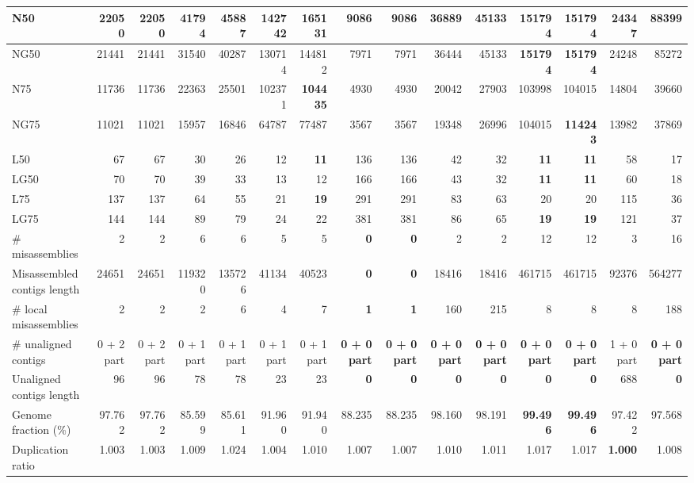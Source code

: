 \documentclass[12pt,a4paper]{article}
\begin{document}
\begin{table}[ht]
\begin{center}
\begin{tabular}{|l*{14}{|r}|}
N50 & 22050 & 22050 & 41794 & 45887 & 142742 & {\bf 165131} & 9086 & 9086 & 36889 & 45133 & 151794 & 151794 & 24347 & 88399 \\ \hline
NG50 & 21441 & 21441 & 31540 & 40287 & 130714 & 144812 & 7971 & 7971 & 36444 & 45133 & {\bf 151794} & {\bf 151794} & 24248 & 85272 \\ \hline
N75 & 11736 & 11736 & 22363 & 25501 & 102371 & {\bf 104435} & 4930 & 4930 & 20042 & 27903 & 103998 & 104015 & 14804 & 39660 \\ \hline
NG75 & 11021 & 11021 & 15957 & 16846 & 64787 & 77487 & 3567 & 3567 & 19348 & 26996 & 104015 & {\bf 114243} & 13982 & 37869 \\ \hline
L50 & 67 & 67 & 30 & 26 & 12 & {\bf 11} & 136 & 136 & 42 & 32 & {\bf 11} & {\bf 11} & 58 & 17 \\ \hline
LG50 & 70 & 70 & 39 & 33 & 13 & 12 & 166 & 166 & 43 & 32 & {\bf 11} & {\bf 11} & 60 & 18 \\ \hline
L75 & 137 & 137 & 64 & 55 & 21 & {\bf 19} & 291 & 291 & 83 & 63 & 20 & 20 & 115 & 36 \\ \hline
LG75 & 144 & 144 & 89 & 79 & 24 & 22 & 381 & 381 & 86 & 65 & {\bf 19} & {\bf 19} & 121 & 37 \\ \hline
\# misassemblies & 2 & 2 & 6 & 6 & 5 & 5 & {\bf 0} & {\bf 0} & 2 & 2 & 12 & 12 & 3 & 16 \\ \hline
Misassembled contigs length & 24651 & 24651 & 119320 & 135726 & 41134 & 40523 & {\bf 0} & {\bf 0} & 18416 & 18416 & 461715 & 461715 & 92376 & 564277 \\ \hline
\# local misassemblies & 2 & 2 & 2 & 6 & 4 & 7 & {\bf 1} & {\bf 1} & 160 & 215 & 8 & 8 & 8 & 188 \\ \hline
\# unaligned contigs & 0 + 2 part & 0 + 2 part & 0 + 1 part & 0 + 1 part & 0 + 1 part & 0 + 1 part & {\bf 0 + 0 part} & {\bf 0 + 0 part} & {\bf 0 + 0 part} & {\bf 0 + 0 part} & {\bf 0 + 0 part} & {\bf 0 + 0 part} & 1 + 0 part & {\bf 0 + 0 part} \\ \hline
Unaligned contigs length & 96 & 96 & 78 & 78 & 23 & 23 & {\bf 0} & {\bf 0} & {\bf 0} & {\bf 0} & {\bf 0} & {\bf 0} & 688 & {\bf 0} \\ \hline
Genome fraction (\%) & 97.762 & 97.762 & 85.599 & 85.611 & 91.960 & 91.940 & 88.235 & 88.235 & 98.160 & 98.191 & {\bf 99.496} & {\bf 99.496} & 97.422 & 97.568 \\ \hline
Duplication ratio & 1.003 & 1.003 & 1.009 & 1.024 & 1.004 & 1.010 & 1.007 & 1.007 & 1.010 & 1.011 & 1.017 & 1.017 & {\bf 1.000} & 1.008 \\ \hline

\end{tabular}
\end{center}
\end{table}
\end{document}

